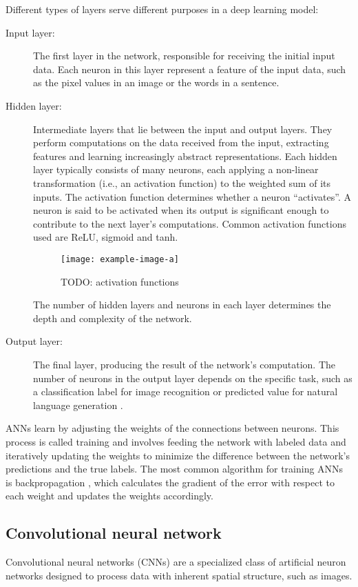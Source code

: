 Different types of layers serve different purposes in a deep learning model:
\begin{description}
    \item[Input layer:] 
    The first layer in the network, responsible for receiving the initial input data.
    Each neuron in this layer represent a feature of the input data, such as the pixel values in an image or the words in a sentence.
    \item[Hidden layer:] 
    Intermediate layers that lie between the input and output layers.
    They perform computations on the data received from the input, extracting features and learning increasingly abstract representations.
    Each hidden layer typically consists of many neurons, each applying a non-linear transformation (i.e., an activation function) to the weighted sum of its inputs.
    The activation function determines whether a neuron ``activates''.
    A neuron is said to be activated when its output is significant enough to contribute to the next layer's computations.
    Common activation functions used are ReLU, sigmoid and tanh.

    \begin{figure}[hbtp]
        \centering    
        \texttt{[image: example-image-a]}
        \caption{TODO: activation functions}
    \end{figure}

    The number of hidden layers and neurons in each layer determines the depth and complexity of the network.
    \item[Output layer:] 
    The final layer, producing the result of the network's computation.
    The number of neurons in the output layer depends on the specific task, such as a classification label for image recognition or predicted value for natural language generation \cite{}.
\end{description}

ANNs learn by adjusting the weights of the connections between neurons.
This process is called training and involves feeding the network with labeled data and iteratively updating the weights to minimize the difference between the network's predictions and the true labels.
The most common algorithm for training ANNs is backpropagation \cite{}, which calculates the gradient of the error with respect to each weight and updates the weights accordingly.

\subsection{Convolutional neural network}
Convolutional neural networks (CNNs) are a specialized class of artificial neuron networks designed to process data with inherent spatial structure, such as images.

